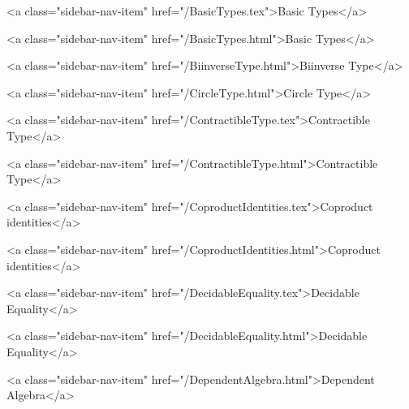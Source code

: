           <a class="sidebar-nav-item" href="/BasicTypes.tex">Basic Types</a>
        
      
    
      
        
          <a class="sidebar-nav-item" href="/BasicTypes.html">Basic Types</a>
        
      
    
      
        
          <a class="sidebar-nav-item" href="/BiinverseType.html">Biinverse Type</a>
        
      
    
      
        
          <a class="sidebar-nav-item" href="/CircleType.html">Circle Type</a>
        
      
    
      
        
          <a class="sidebar-nav-item" href="/ContractibleType.tex">Contractible Type</a>
        
      
    
      
        
          <a class="sidebar-nav-item" href="/ContractibleType.html">Contractible Type</a>
        
      
    
      
        
          <a class="sidebar-nav-item" href="/CoproductIdentities.tex">Coproduct identities</a>
        
      
    
      
        
          <a class="sidebar-nav-item" href="/CoproductIdentities.html">Coproduct identities</a>
        
      
    
      
        
          <a class="sidebar-nav-item" href="/DecidableEquality.tex">Decidable Equality</a>
        
      
    
      
        
          <a class="sidebar-nav-item" href="/DecidableEquality.html">Decidable Equality</a>
        
      
    
      
        
          <a class="sidebar-nav-item" href="/DependentAlgebra.html">Dependent Algebra</a>
        
      
    
